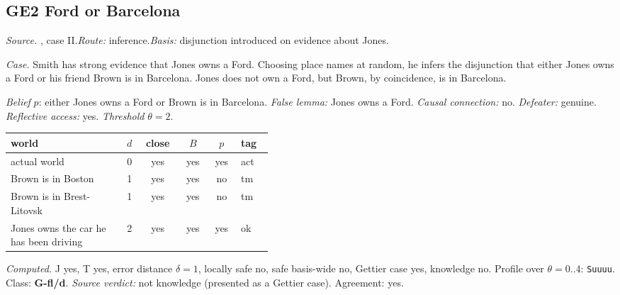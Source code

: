 \subsection*{GE2 \enspace Ford or Barcelona}
\noindent\textit{Source.} \citet{Gettier1963}, case II.\quad \textit{Route:} inference.\quad \textit{Basis:} disjunction introduced on evidence about Jones.\par
\noindent\textit{Case.} Smith has strong evidence that Jones owns a Ford. Choosing place names at random, he infers the disjunction that either Jones owns a Ford or his friend Brown is in Barcelona. Jones does not own a Ford, but Brown, by coincidence, is in Barcelona.\par
\noindent\textit{Belief} $p$: either Jones owns a Ford or Brown is in Barcelona.
 \textit{False lemma:} Jones owns a Ford. \textit{Causal connection:} no. \textit{Defeater:} genuine. \textit{Reflective access:} yes. \textit{Threshold} $\theta = 2$.\par
\begin{center}\begin{tabular}{@{}p{0.43\linewidth}rcccl@{}}
world & $d$ & close & $B$ & $p$ & tag \\ \midrule
actual world & 0 & yes & yes & yes & act \\
Brown is in Boston & 1 & yes & yes & no & tm \\
Brown is in Brest-Litovsk & 1 & yes & yes & no & tm \\
Jones owns the car he has been driving & 2 & yes & yes & yes & ok \\
\end{tabular}\end{center}
\noindent\textit{Computed.} J yes, T yes, error distance $\delta = 1$, locally safe no, safe basis-wide no, Gettier case yes, knowledge no. Profile over $\theta = 0..4$: \texttt{Suuuu}. Class: \textbf{G-fl/d}.
 \textit{Source verdict:} not knowledge (presented as a Gettier case). Agreement: yes.
\par\medskip
{}
